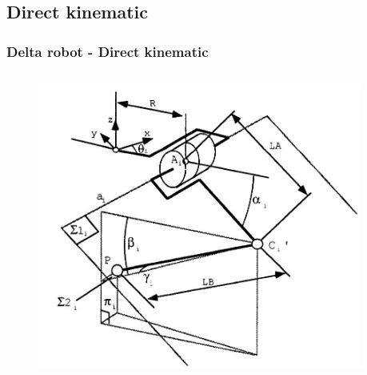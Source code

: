\subsection{Direct kinematic}
\begin{frame}
\frametitle{Delta robot - Direct kinematic}
	\begin{columns}
    \begin{column}{0.48\textwidth}
        	\begin{figure}
        		\includegraphics[width=1\linewidth]{img/DeltaRobotClavelpg26.JPG}
        	\end{figure}
    \end{column}
    \begin{column}{0.48\textwidth}
    \end{column}
\end{columns}


\end{frame}
%

